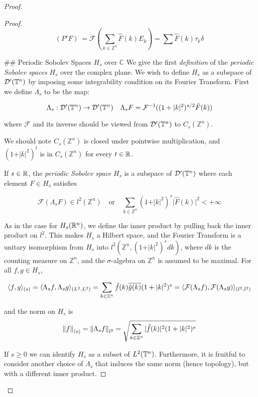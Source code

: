 \documentclass[../main-manifolds.tex]{subfiles}
\begin{document}
{{\begin{proof}
{{\begin{proof}
$$
(P'F)^{\hat{\:}} = \mathcal{F}(\sum_{k\in\mathbb{Z}^n} \hat{F}(k)E_k) = \sum \hat{F}(k)\tau_k\delta
$$


## Periodic Sobolev Spaces $H_s$ over $\mathbb{C}$
We give the first \emph{definition} of the \emph{periodic Sobolev spaces} $H_s$ over the complex plane. We wish to define $H_s$ as a subspace of $\mathcal{D}'({\mathbb{T}^n})$ by imposing some integrability condition on its Fourier Transform. First we define $\Lambda_s$ to be the map:

$$
\Lambda_s: \mathcal{D}'({\mathbb{T}^n})\to \mathcal{D}'({\mathbb{T}^n})\quad \Lambda_s F = \mathcal{F}^{-1}((1+\vert k\vert^2)^{s/2}\hat{F}(k))
$$

where $\mathcal{F}$ and its inverse should be viewed from $\mathcal{D}'({\mathbb{T}^n})$ to $C_s(\mathbb{Z}^n)$.

\begin{remark}
We should note $C_s(\mathbb{Z}^n)$ is closed under pointwise multiplication, and $(1+\vert k\vert^2)^{t}$ is in $C_s(\mathbb{Z}^n)$ for every $t\in\mathbb{R}$.
\end{remark}

\begin{definition}
If $s\in\mathbb{R}$, the \emph{periodic Sobolev space} $H_s$ is a subspace of $\mathcal{D}'({\mathbb{T}^n})$ where each element $F\in H_s$ satisfies

$$
\mathcal{F}(\Lambda_s F)\in l^2(\mathbb{Z}^n)\quad\text{or}\quad \sum_{k\in\mathbb{Z}^n}(1+\vert k\vert^2)^s\vert\hat{F}(k)\vert^2< +\infty
$$

\end{definition}

As in the case for $H_s({\mathbb{R}^n})$, we define the inner product by pulling back the inner product on $l^2$. This makes $H_s$ a Hilbert space, and the Fourier Transform is a unitary isomorphism from $H_s$ into $l^2(\mathbb{Z}^n, (1+\vert k\vert^2)^{s}dk)$, where $dk$ is the counting measure on $\mathbb{Z}^n$, and the $\sigma$-algebra on $\mathbb{Z}^n$ is assumed to be maximal. For all $f,g\in H_s$,

$$
\langle f,g\rangle_{(s)} = \langle \Lambda_s f,\Lambda_s g\rangle_{(L^2,L^2)} = \sum_{k\in\mathbb{Z}^n}\hat{f}(k)\overline{\hat{g}(k)}(1+\vert k \vert^2)^{s} = \langle \mathcal{F}(\Lambda_s f),\mathcal{F}(\Lambda_s g)\rangle_{(l^2,l^2)}
$$

and the norm on $H_s$ is $$\norm{f}_{(s)} = \norm{\Lambda_s f}_{l^2} =\sqrt{\sum_{k\in\mathbb{Z}^n}\vert\hat{f}(k)\vert^2(1+\vert k \vert^2)^s}$$

If $s\geq 0$ we can identify $H_s$ as a subset of $L^2({\mathbb{T}^n})$. Furthermore, it is fruitful to consider another choice of $\Lambda_s$ that induces the same norm (hence topology), but with a different inner product.


\end{proof}}}
\end{proof}}}
\end{document}
